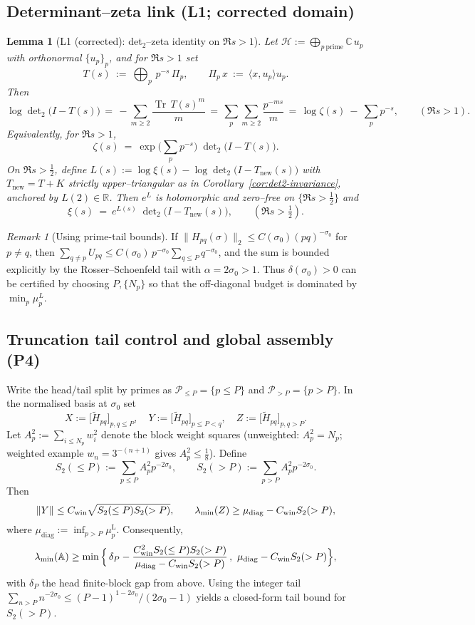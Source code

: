 \documentclass[11pt]{article}
\newtheorem{lemma}[theorem]{Lemma}
\theoremstyle{definition}
\theoremstyle{remark}
\newtheorem{remark}[theorem]{Remark}
\newcommand{\R}{\mathbb{R}}
\begin{document}
\subsection*{Determinant--zeta link (L1; corrected domain)}
\begin{lemma}[L1 (corrected): det$_2$--zeta identity on $\Re s>1$]\label{lem:L1-det2-zeta}
Let $\mathcal H:=\bigoplus_{p\ \mathrm{prime}} \mathbb C\,u_p$ with orthonormal $\{u_p\}_p$, and for $\Re s>1$ set
\[
  T(s)\ :=\ \bigoplus_{p}\, p^{-s}\,\Pi_p,\qquad \Pi_p\,x\ :=\ \langle x, u_p\rangle u_p.
\]
Then
\[
  \log\det\nolimits_{2}\bigl(I-T(s)\bigr)
  \,=\, -\sum_{m\ge2}\frac{\operatorname{Tr}\,T(s)^{m}}{m}
  \,=\, \sum_{p}\sum_{m\ge2}\frac{p^{-ms}}{m}
  \,=\, \log\zeta(s)\ -\ \sum_{p}p^{-s},\qquad (\Re s>1).
\]
Equivalently, for $\Re s>1$,
\[
  \zeta(s)\ =\ \exp\!\Big(\sum_{p}p^{-s}\Big)\;\det\nolimits_{2}\bigl(I-T(s)\bigr).
\]
On $\Re s>\tfrac12$, define $L(s):=\log\xi(s)-\log\det_{2}\big(I-T_{\mathrm{new}}(s)\big)$ with $T_{\mathrm{new}}=T+K$ strictly upper--triangular as in Corollary~\ref{cor:det2-invariance}, anchored by $L(2)\in\R$. Then $e^{L}$ is holomorphic and zero--free on $\{\Re s>\tfrac12\}$ and
\[
  \xi(s)\ =\ e^{L(s)}\;\det\nolimits_{2}\bigl(I-T_{\mathrm{new}}(s)\bigr),\qquad (\Re s>\tfrac12).
\]
\end{lemma}

\begin{remark}[Using prime-tail bounds]
If $\|H_{pq}(\sigma)\|_2\le C(\sigma_0)(pq)^{-\sigma_0}$ for $p\ne q$, then $\sum_{q\ne p}U_{pq}\le C(\sigma_0)\,p^{-\sigma_0}\sum_{q\le P} q^{-\sigma_0}$, and the sum is bounded explicitly by the Rosser--Schoenfeld tail with $\alpha=2\sigma_0>1$. Thus $\delta(\sigma_0)>0$ can be certified by choosing $P,\{N_p\}$ so that the off-diagonal budget is dominated by $\min_p\mu_p^L$.
\end{remark}

\subsection*{Truncation tail control and global assembly (P4)}
Write the head/tail split by primes as $\mathcal P_{\le P}=\{p\le P\}$ and $\mathcal P_{>P}=\{p>P\}$. In the normalised basis at $\sigma_0$ set
\[
 X:=\bigl[\widetilde H_{pq}\bigr]_{p,q\le P},\quad Y:=\bigl[\widetilde H_{pq}\bigr]_{p\le P<q},\quad Z:=\bigl[\widetilde H_{pq}\bigr]_{p,q>P}.
\]
Let $A_p^2:=\sum_{i\le N_p} w_i^2$ denote the block weight squares (unweighted: $A_p^2=N_p$; weighted example $w_n=3^{-(n+1)}$ gives $A_p^2\le\tfrac18$). Define
\[ S_2(\le P):=\sum_{p\le P} A_p^2 p^{-2\sigma_0},\qquad S_2(>P):=\sum_{p>P} A_p^2 p^{-2\sigma_0}. \]
Then
\[ \|Y\|\le C_{\rm win}\sqrt{S_2(\le P)S_2(>P)},\qquad \lambda_{\min}(Z)\ge \mu_{\mathrm{diag}}-C_{\rm win}S_2(>P), \]
where $\mu_{\mathrm{diag}}:=\inf_{p>P}\mu_p^{\mathrm L}$. Consequently,
\[ \lambda_{\min}(\mathbb A)\ge \min\Big\{\,\delta_P - \dfrac{C_{\rm win}^2 S_2(\le P)S_2(>P)}{\mu_{\mathrm{diag}}-C_{\rm win}S_2(>P)}\,,\ \mu_{\mathrm{diag}}-C_{\rm win}S_2(>P)\Big\}, \]
with $\delta_P$ the head finite-block gap from above. Using the integer tail $\sum_{n>P}n^{-2\sigma_0}\le (P-1)^{1-2\sigma_0}/(2\sigma_0-1)$ yields a closed-form tail bound for $S_2(>P)$.
\end{document}
